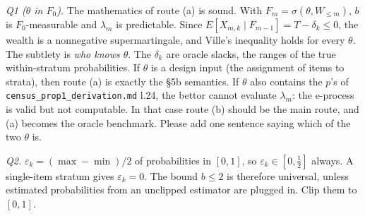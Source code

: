 \documentclass[11pt]{article}
\begin{document}
\emph{Q1 ($\theta$ in $F_0$).} The mathematics of route (a) is sound. With $F_m=\sigma(\theta,W_{\le m})$, $b$ is $F_0$-measurable and $\lambda_m$ is predictable. Since $E[X_{m,k}\mid F_{m-1}]=T-\delta_k\le0$, the wealth is a nonnegative supermartingale, and Ville's inequality holds for every $\theta$. The subtlety is \emph{who knows $\theta$}. The $\delta_k$ are oracle slacks, the ranges of the true within-stratum probabilities. If $\theta$ is a design input (the assignment of items to strata), then route (a) is exactly the \S5b semantics. If $\theta$ also contains the $p$'s of \texttt{census\_prop1\_derivation.md} l.24, the bettor cannot evaluate $\lambda_m$: the e-process is valid but not computable. In that case route (b) should be the main route, and (a) becomes the oracle benchmark. Please add one sentence saying which of the two $\theta$ is.

\emph{Q2.} $\varepsilon_k=(\max-\min)/2$ of probabilities in $[0,1]$, so $\varepsilon_k\in[0,\tfrac12]$ always. A single-item stratum gives $\varepsilon_k=0$. The bound $b\le2$ is therefore universal, unless estimated probabilities from an unclipped estimator are plugged in. Clip them to $[0,1]$.
\end{document}
